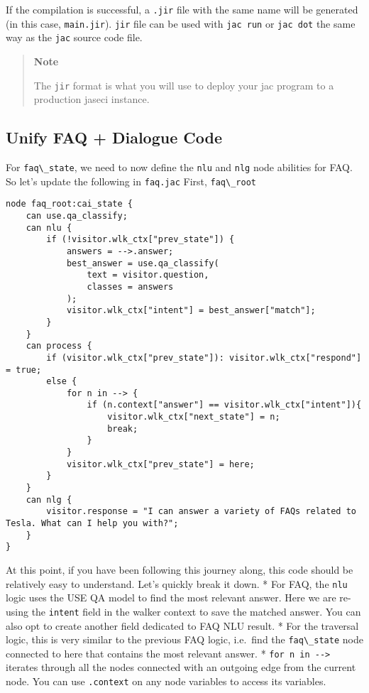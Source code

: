 If the compilation is successful, a \passthrough{\lstinline!.jir!} file
with the same name will be generated (in this case,
\passthrough{\lstinline!main.jir!}). \passthrough{\lstinline!jir!} file
can be used with \passthrough{\lstinline!jac run!} or
\passthrough{\lstinline!jac dot!} the same way as the
\passthrough{\lstinline!jac!} source code file.

\begin{quote}
\textbf{Note}

The \passthrough{\lstinline!jir!} format is what you will use to deploy
your jac program to a production jaseci instance.
\end{quote}

\hypertarget{unify-faq-dialogue-code}{%
\subsection{Unify FAQ + Dialogue Code}\label{unify-faq-dialogue-code}}

For \passthrough{\lstinline!faq\_state!}, we need to now define the
\passthrough{\lstinline!nlu!} and \passthrough{\lstinline!nlg!} node
abilities for FAQ. So let's update the following in
\passthrough{\lstinline!faq.jac!} First,
\passthrough{\lstinline!faq\_root!}

\begin{lstlisting}
node faq_root:cai_state {
    can use.qa_classify;
    can nlu {
        if (!visitor.wlk_ctx["prev_state"]) {
            answers = -->.answer;
            best_answer = use.qa_classify(
                text = visitor.question,
                classes = answers
            );
            visitor.wlk_ctx["intent"] = best_answer["match"];
        }
    }
    can process {
        if (visitor.wlk_ctx["prev_state"]): visitor.wlk_ctx["respond"] = true;
        else {
            for n in --> {
                if (n.context["answer"] == visitor.wlk_ctx["intent"]){
                    visitor.wlk_ctx["next_state"] = n;
                    break;
                }
            }
            visitor.wlk_ctx["prev_state"] = here;
        }
    }
    can nlg {
        visitor.response = "I can answer a variety of FAQs related to Tesla. What can I help you with?";
    }
}
\end{lstlisting}

At this point, if you have been following this journey along, this code
should be relatively easy to understand. Let's quickly break it down. *
For FAQ, the \passthrough{\lstinline!nlu!} logic uses the USE QA model
to find the most relevant answer. Here we are re-using the
\passthrough{\lstinline!intent!} field in the walker context to save the
matched answer. You can also opt to create another field dedicated to
FAQ NLU result. * For the traversal logic, this is very similar to the
previous FAQ logic, i.e.~find the \passthrough{\lstinline!faq\_state!}
node connected to here that contains the most relevant answer. *
\passthrough{\lstinline!for n in -->!} iterates through all the nodes
connected with an outgoing edge from the current node. You can use
\passthrough{\lstinline!.context!} on any node variables to access its
variables.

